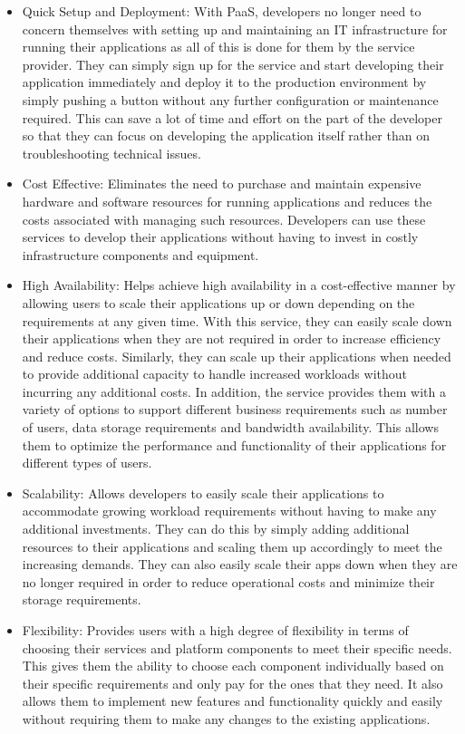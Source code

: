 \documentclass[BIF,Master,nenglish]{twbook}%
\begin{document}
\begin{itemize}
\item Quick Setup and Deployment: With PaaS, developers no longer need to concern themselves with setting up and maintaining an IT infrastructure for running their applications as all of this is done for them by the service provider. They can simply sign up for the service and start developing their application immediately and deploy it to the production environment by simply pushing a button without any further configuration or maintenance required. This can save a lot of time and effort on the part of the developer so that they can focus on developing the application itself rather than on troubleshooting technical issues.\cite{law2008}

\item Cost Effective: Eliminates the need to purchase and maintain expensive hardware and software resources for running applications and reduces the costs associated with managing such resources. Developers can use these services to develop their applications without having to invest in costly infrastructure components and equipment.\cite{gai2014}

\item High Availability: Helps achieve high availability in a cost-effective manner by allowing users to scale their applications up or down depending on the requirements at any given time. With this service, they can easily scale down their applications when they are not required in order to increase efficiency and reduce costs. Similarly, they can scale up their applications when needed to provide additional capacity to handle increased workloads without incurring any additional costs. In addition, the service provides them with a variety of options to support different business requirements such as number of users, data storage requirements and bandwidth availability. This allows them to optimize the performance and functionality of their applications for different types of users. 

\item Scalability: Allows developers to easily scale their applications to accommodate growing workload requirements without having to make any additional investments.\cite{law2008} They can do this by simply adding additional resources to their applications and scaling them up accordingly to meet the increasing demands. They can also easily scale their apps down when they are no longer required in order to reduce operational costs and minimize their storage requirements.

\item Flexibility: Provides users with a high degree of flexibility in terms of choosing their services and platform components to meet their specific needs. This gives them the ability to choose each component individually based on their specific requirements and only pay for the ones that they need. It also allows them to implement new features and functionality quickly and easily without requiring them to make any changes to the existing applications. 
\end{itemize}
\end{document}
